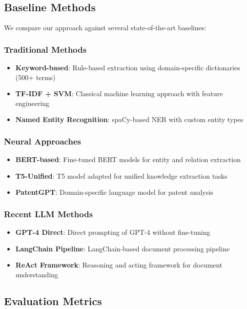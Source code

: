 \documentclass[11pt,a4paper]{article}
\begin{document}
\subsection{Baseline Methods}

We compare our approach against several state-of-the-art baselines:

\subsubsection{Traditional Methods}
\begin{itemize}
  \item \textbf{Keyword-based}: Rule-based extraction using domain-specific dictionaries (500+ terms)
  \item \textbf{TF-IDF + SVM}: Classical machine learning approach with feature engineering
  \item \textbf{Named Entity Recognition}: spaCy-based NER with custom entity types
\end{itemize}

\subsubsection{Neural Approaches}
\begin{itemize}
  \item \textbf{BERT-based}: Fine-tuned BERT models for entity and relation extraction
  \item \textbf{T5-Unified}: T5 model adapted for unified knowledge extraction tasks
  \item \textbf{PatentGPT}: Domain-specific language model for patent analysis \citep{bai2024patentgpt}
\end{itemize}

\subsubsection{Recent LLM Methods}
\begin{itemize}
  \item \textbf{GPT-4 Direct}: Direct prompting of GPT-4 without fine-tuning
  \item \textbf{LangChain Pipeline}: LangChain-based document processing pipeline
  \item \textbf{ReAct Framework}: Reasoning and acting framework for document understanding
\end{itemize}

\subsection{Evaluation Metrics}
\end{document}
